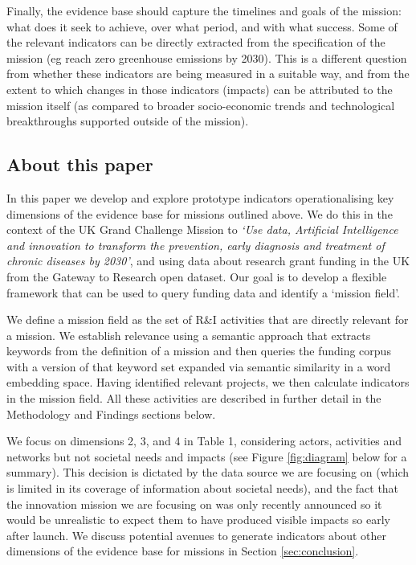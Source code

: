 \documentclass[11pt]{article}
\begin{document}
Finally, the evidence base should capture the time\-lines and goals of the mission: what does it seek to achieve, over what period, and with what success. Some of the relevant indicators can be directly extracted from the specification of the mission (eg reach zero greenhouse emissions by 2030). This is a different question from whether these indicators are being measured in a suitable way, and from the extent to which changes in those indicators (impacts) can be attributed to the mission itself (as compared to broader socio-economic trends and technological breakthroughs supported outside of the mission). 

\subsection{About this paper}
\label{subsec: about}

In this paper we develop and explore prototype indicators operationalising key dimensions of the evidence base for missions outlined above. We do this in the context of the UK Grand Challenge Mission to \textit{`Use data, Artificial Intelligence and innovation to transform the prevention, early diagnosis and treatment of chronic diseases by 2030'}, and using data about research grant funding in the UK from the Gateway to Research open dataset. Our goal is to develop a flexible framework that can be used to query funding data and identify a `mission field'. 

We define a mission field as the set of R&I activities that are directly relevant for a mission. We establish relevance using a semantic approach that extracts keywords from the definition of a mission and then queries the funding corpus with a version of that keyword set expanded via semantic similarity in a word embedding space. Having identified relevant projects, we then calculate indicators in the mission field. All these activities are described in further detail in the Methodology and Findings sections below.

We focus on dimensions 2, 3, and 4 in Table 1, considering actors, activities and networks but not societal needs and impacts (see Figure \ref{fig:diagram} below for a summary). This decision is dictated by the data source we are focusing on (which is limited in its coverage of information about societal needs), and the fact that the innovation mission we are focusing on was only recently announced so it would be unrealistic to expect them to have produced visible impacts so early after launch. We discuss potential avenues to generate indicators about other dimensions of the evidence base for missions in Section \ref{sec:conclusion}.
\end{document}
